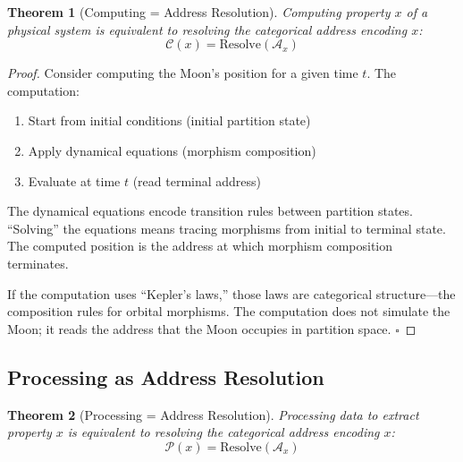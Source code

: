 \documentclass[12pt,a4paper]{article}
\newtheorem{theorem}{Theorem}[section]
\theoremstyle{definition}
\theoremstyle{remark}
\newcommand{\Comp}{\mathcal{C}}
\newcommand{\Proc}{\mathcal{P}}
\begin{document}
\begin{theorem}[Computing = Address Resolution]
\label{thm:comp}
Computing property $x$ of a physical system is equivalent to resolving the categorical address encoding $x$:
\begin{equation}
\Comp(x) = \text{Resolve}(\mathcal{A}_x)
\end{equation}
\end{theorem}

\begin{proof}
Consider computing the Moon's position for a given time $t$. The computation:
\begin{enumerate}
    \item Start from initial conditions (initial partition state)
    \item Apply dynamical equations (morphism composition)
    \item Evaluate at time $t$ (read terminal address)
\end{enumerate}

The dynamical equations encode transition rules between partition states. ``Solving'' the equations means tracing morphisms from initial to terminal state. The computed position is the address at which morphism composition terminates.

If the computation uses ``Kepler's laws,'' those laws are categorical structure---the composition rules for orbital morphisms. The computation does not simulate the Moon; it reads the address that the Moon occupies in partition space. $\square$
\end{proof}

\subsection{Processing as Address Resolution}

\begin{theorem}[Processing = Address Resolution]
\label{thm:proc}
Processing data to extract property $x$ is equivalent to resolving the categorical address encoding $x$:
\begin{equation}
\Proc(x) = \text{Resolve}(\mathcal{A}_x)
\end{equation}
\end{theorem}
\end{document}
